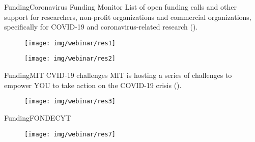 \documentclass[10pt]{beamer}
\newcommand{\1}{
        	\setbeamertemplate{background}{
        		\texttt{[image: img/1]}
        		\tikz[overlay] \fill[fill opacity=0.75,fill=white] (0,0) rectangle (-\paperwidth,\paperheight);
        	}
}
\begin{document}
\begin{frame}{Funding}{Coronavirus Funding Monitor}
	List of open funding calls and other support for researchers, non-profit organizations and commercial organizations, specifically for COVID-19 and coronavirus-related research (\href{https://coronavirus.frontiersin.org/covid-19-research-funding-monitor?utm_source=ad&utm_medium=lk&utm_campaign=ba_cov-cco_corp}{}).
	\begin{figure}[]
		\centering
		\texttt{[image: img/webinar/res1]}				
	\end{figure}

	\begin{figure}[]
		\centering
		\texttt{[image: img/webinar/res2]}				
	\end{figure}
\end{frame}

\begin{frame}{Funding}{MIT CVID-19 challenges }
	MIT is hosting a series of challenges to empower YOU to take action on the COVID-19 crisis (\href{https://covid19challenge.mit.edu/}{}).
	\begin{figure}[]
		\centering
		\texttt{[image: img/webinar/res3]}				
	\end{figure}	
\end{frame}

\begin{frame}{Funding}{FONDECYT}	
	\begin{figure}[]
		\centering
		\texttt{[image: img/webinar/res7]}				
	\end{figure}	
\end{frame}

\end{document}
